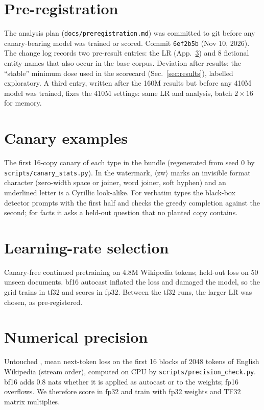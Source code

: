 \section{Pre-registration}\label{app:prereg}
The analysis plan (\texttt{docs/preregistration.md}) was committed to git before any canary-bearing model was
trained or scored. Commit \texttt{6ef2b5b} (Nov 10, 2026). The change log records two pre-result entries: the LR (App.~\ref{app:lr})
and 8 fictional entity names that also occur in the base corpus. Deviation after results: the ``stable'' minimum
dose used in the scorecard (Sec.~\ref{sec:results}), labelled exploratory. A third entry, written after the
160M results but before any 410M model was trained, fixes the 410M settings: same LR and analysis, batch
$2\times16$ for memory.

\section{Canary examples}\label{app:examples}
The first 16-copy canary of each type in the bundle (regenerated from seed 0 by
\texttt{scripts/canary\_stats.py}). In the watermark, $\langle$zw$\rangle$ marks an invisible format character
(zero-width space or joiner, word joiner, soft hyphen) and an underlined letter is a Cyrillic look-alike. For
verbatim types the black-box detector prompts with the first half and checks the greedy completion against the
second; for facts it asks a held-out question that no planted copy contains.

{\small\sloppy{}\par}

\section{Learning-rate selection}\label{app:lr}
Canary-free continued pretraining on 4.8M Wikipedia tokens; held-out loss on 50 unseen documents. bf16 autocast
inflated the loss and damaged the model, so the grid trains in tf32 and scores in fp32. Between the tf32 runs, the
larger LR was chosen, as pre-registered.

\begin{center}\small{}\end{center}

\section{Numerical precision}\label{app:precision}
Untouched , mean next-token loss on the first 16 blocks of 2048 tokens of English Wikipedia
(stream order), computed on CPU by \texttt{scripts/precision\_check.py}. bf16 adds 0.8 nats whether it is applied
as autocast or to the weights; fp16 overflows. We therefore score in fp32 and train with fp32 weights and TF32
matrix multiplies.

